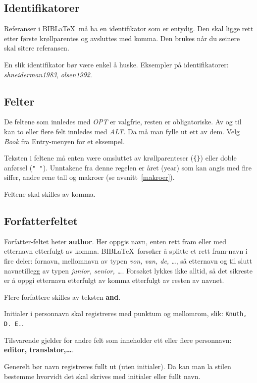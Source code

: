\documentclass[11pt,norsk,a4paper]{article}
\newcommand{\blt}{B{\smaller[2]IB}\discretionary{-}{}{\kern
    -0.12em}\LaTeX{}}
\begin{document}
\subsection*{Identifikatorer}
Referanser i \blt\ må ha en identifikator som er entydig. Den skal
ligge rett etter første krøllparentes og avsluttes med komma. Den
brukes når du seinere skal sitere referansen.

En slik identifikator bør være enkel å huske. Eksempler på identifikatorer: \textit{shneiderman1983},
\textit{olsen1992}.  

\subsection*{Felter}
De feltene som innledes
med \textit{OPT} er valgfrie, resten er obligatoriske. Av og til kan
to eller flere felt innledes med \textit{ALT}. Da må man fylle ut ett
av dem. Velg \textit{Book} fra Entry-menyen for et eksempel.

Teksten i feltene må enten være omsluttet av krøllparenteser
(\verb={}=) eller doble anførsel (\verb=" "=). Unntakene fra
denne regelen er året (year) som kan angis med fire siffer, andre rene tall og
makroer (se avsnitt~\ref{makroer}).

Feltene skal skilles av komma.

\subsection*{Forfatterfeltet}
Forfatter-feltet heter \textbf{author}. Her oppgis navn, enten rett
fram eller med etternavn etterfulgt av komma. \blt\ forsøker å splitte
et rett fram-navn i fire deler: fornavn, mellomnavn av typen \textit{von, van,
  de, \ldots}, så etternavn og til slutt navnetillegg av typen
\textit{junior, senior, \ldots}. Forsøket lykkes ikke alltid, så det
sikreste er å oppgi etternavn etterfulgt av komma etterfulgt av resten
av navnet.

Flere forfattere skilles av teksten
\textbf{and}.

Initialer i personnavn skal registreres med punktum og mellomrom,
slik: \texttt{Knuth, D. E.}.

Tilsvarende gjelder for andre felt som inneholder ett eller flere
personnavn: \textbf{editor, translator,\ldots}.

Generelt bør navn registreres fullt ut (uten initialer). Da kan man la
stilen bestemme hvorvidt det skal skrives med initialer eller fullt navn.
\end{document}
